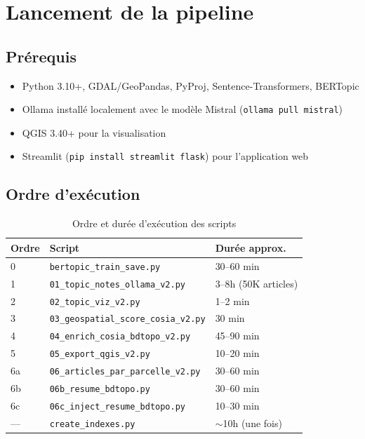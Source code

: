 \documentclass[12pt,a4paper]{report}
\newcommand{\code}[1]{\texttt{\small #1}}
\begin{document}
\section{Lancement de la pipeline}

\subsection{Prérequis}

\begin{itemize}
  \item Python 3.10+, GDAL/GeoPandas, PyProj, Sentence-Transformers, BERTopic
  \item Ollama installé localement avec le modèle Mistral (\code{ollama pull mistral})
  \item QGIS 3.40+ pour la visualisation
  \item Streamlit (\code{pip install streamlit flask}) pour l'application web
\end{itemize}

\subsection{Ordre d'exécution}

\begin{table}[H]
\centering
\begin{tabular}{lll}
\toprule
\textbf{Ordre} & \textbf{Script} & \textbf{Durée approx.} \\
\midrule
0 & \code{bertopic\_train\_save.py} & 30–60 min \\
1 & \code{01\_topic\_notes\_ollama\_v2.py} & 3–8h (50K articles) \\
2 & \code{02\_topic\_viz\_v2.py} & 1–2 min \\
3 & \code{03\_geospatial\_score\_cosia\_v2.py} & 30 min \\
4 & \code{04\_enrich\_cosia\_bdtopo\_v2.py} & 45–90 min \\
5 & \code{05\_export\_qgis\_v2.py} & 10–20 min \\
6a & \code{06\_articles\_par\_parcelle\_v2.py} & 30–60 min \\
6b & \code{06b\_resume\_bdtopo.py} & 30–60 min \\
6c & \code{06c\_inject\_resume\_bdtopo.py} & 10–30 min \\
— & \code{create\_indexes.py} & $\sim$10h (une fois) \\
\bottomrule
\end{tabular}
\caption{Ordre et durée d'exécution des scripts}
\end{table}
\end{document}
